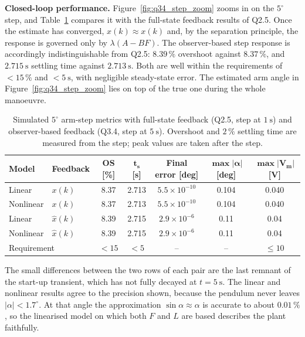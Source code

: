 \documentclass[11pt,a4paper]{article}
\begin{document}
\textbf{Closed-loop performance.}
Figure~\ref{fig:q34_step_zoom} zooms in on the $5^\circ$ step, and
Table~\ref{tab:q34_metrics} compares it with the full-state feedback results of
Q2.5. Once the estimate has converged, $\hat x(k)\approx x(k)$ and, by the
separation principle, the response is governed only by $\lambda(A-BF)$. The
observer-based step response is accordingly indistinguishable from Q2.5:
$8.39\,\%$ overshoot against $8.37\,\%$, and $2.715~\mathrm s$ settling time
against $2.713~\mathrm s$. Both are well within the requirements of
$<15\,\%$ and $<5~\mathrm s$, with negligible steady-state error. The estimated
arm angle in Figure~\ref{fig:q34_step_zoom} lies on top of the true one during
the whole manoeuvre.

\begin{table}[H]\centering
\caption{Simulated $5^\circ$ arm-step metrics with full-state feedback (Q2.5,
step at $1~\mathrm s$) and observer-based feedback (Q3.4, step at
$5~\mathrm s$). Overshoot and $2\,\%$ settling time are measured from the step;
peak values are taken after the step.}
\label{tab:q34_metrics}
\begin{tabular}{llccccc}
\toprule
\textbf{Model} & \textbf{Feedback} & \textbf{OS [\%]} & $\bm{t_s}$ \textbf{[s]}
 & \textbf{Final error [deg]} & $\bm{\max|\alpha|}$ \textbf{[deg]}
 & $\bm{\max|V_m|}$ \textbf{[V]}\\
\midrule
Linear    & $x(k)$       & 8.37 & 2.713 & $5.5\times10^{-10}$ & 0.104 & 0.040\\
Nonlinear & $x(k)$       & 8.37 & 2.713 & $5.5\times10^{-10}$ & 0.104 & 0.040\\
Linear    & $\hat x(k)$  & 8.39 & 2.715 & $2.9\times10^{-6}$  & 0.11  & 0.04\\
Nonlinear & $\hat x(k)$  & 8.39 & 2.715 & $2.9\times10^{-6}$  & 0.11  & 0.04\\
\midrule
\multicolumn{2}{l}{Requirement} & $<15$ & $<5$ & -- & -- & $\le10$\\
\bottomrule
\end{tabular}
\end{table}

The small differences between the two rows of each pair are the last remnant
of the start-up transient, which has not fully decayed at $t=5~\mathrm s$. The
linear and nonlinear results agree to the precision shown, because the
pendulum never leaves $|\alpha|<1.7^\circ$. At that angle the approximation
$\sin\alpha\approx\alpha$ is accurate to about $0.01\,\%$, so the linearised
model on which both $F$ and $L$ are based describes the plant faithfully.
\end{document}
